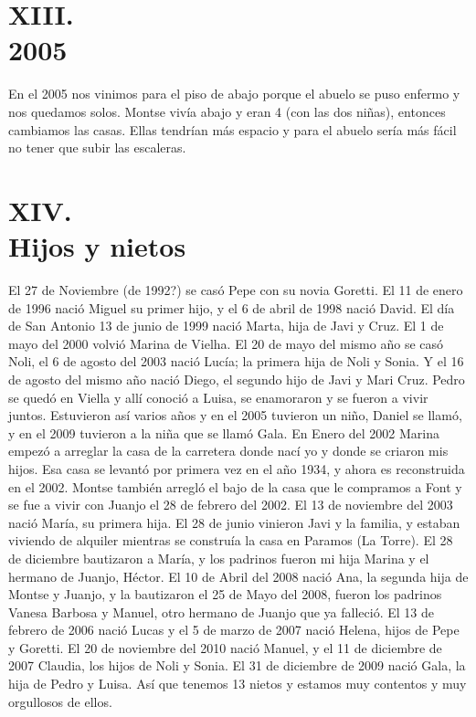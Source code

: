 \documentclass[12pt,a5paper]{book}
\begin{document}
\section*{XIII.\\2005}

En el 2005 nos vinimos para el piso de abajo porque el abuelo se puso enfermo y nos quedamos solos. Montse vivía abajo y eran 4 (con las dos niñas), entonces cambiamos las casas. Ellas tendrían más espacio y para el abuelo sería más fácil no tener que subir las escaleras.


\section*{XIV.\\Hijos y nietos}

El 27 de Noviembre (de 1992?) se casó Pepe con su novia Goretti. El 11 de enero de 1996 nació Miguel su primer hijo, y el 6 de abril de 1998 nació David.
El día de San Antonio 13 de junio de 1999 nació Marta, hija de Javi y Cruz. El 1 de mayo del 2000 volvió Marina de Vielha. El 20 de mayo del mismo año se casó Noli, el 6 de agosto del 2003 nació Lucía; la primera hija de Noli y Sonia. Y el 16 de agosto del mismo año nació Diego, el segundo hijo de Javi y Mari Cruz.
Pedro se quedó en Viella y allí conoció a Luisa, se enamoraron y se fueron a vivir juntos. Estuvieron así varios años y en el 2005 tuvieron un niño, Daniel se llamó, y en el 2009 tuvieron a la niña que se llamó Gala.
En Enero del 2002 Marina empezó a arreglar la casa de la carretera donde nací yo y donde se criaron mis hijos. Esa casa se levantó por primera vez en el año 1934, y ahora es reconstruida en el 2002.
Montse también arregló el bajo de la casa que le compramos a Font y se fue a vivir con Juanjo el 28 de febrero del 2002. El 13 de noviembre del 2003 nació María, su primera hija.
El 28 de junio vinieron Javi y la familia, y estaban viviendo de alquiler mientras se construía la casa en Paramos (La Torre).
El 28 de diciembre bautizaron a María, y los padrinos fueron mi hija Marina y el hermano de Juanjo, Héctor.
El 10 de Abril del 2008 nació Ana, la segunda hija de Montse y Juanjo, y la bautizaron el 25 de Mayo del 2008, fueron los padrinos Vanesa Barbosa y Manuel, otro hermano de Juanjo que ya falleció. El 13 de febrero de 2006 nació Lucas y el 5 de marzo de 2007 nació Helena, hijos de Pepe y Goretti. El 20 de noviembre del 2010 nació Manuel, y el 11 de diciembre de 2007 Claudia, los hijos de Noli y Sonia. El 31 de diciembre de 2009 nació Gala, la hija de Pedro y Luisa. Así que tenemos 13 nietos y estamos muy contentos y muy orgullosos de ellos.
\end{document}
